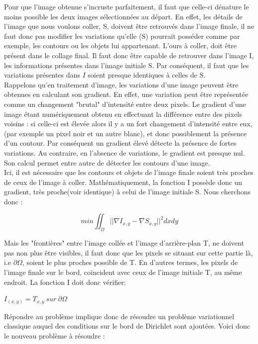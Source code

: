 Pour que l'image obtenue s'incruste parfaitement, il faut que celle-ci dénature le moins possible les deux images sélectionnées au départ. En effet, les détails de l'image que nous voulons coller, S, doivent être retrouvés dans l'image finale, il ne faut donc pas modifier les variations qu'elle (S) pourrait posséder comme par exemple, les contours ou les objets lui appartenant. L'ours  à coller, doit être présent dans le collage final. Il faut donc être capable de retrouver dans l'image I, les informations présentes dans l'image initiale S. Par conséquent, il faut que les variations présentes dans $I$ soient presque identiques à celles de S.\\
Rappelons qu'en traitement d'image, les variations d'une image peuvent être obtenues en calculant son gradient. En effet, une variation peut être représentée comme un changement "brutal" d'intensité entre deux pixels. Le gradient d'une image étant numériquement obtenu en effectuant la différence entre des pixels voisins : si celle-ci est élevée alors il y a un fort changement d'intensité entre eux, (par exemple un pixel noir et un autre blanc), et donc possiblement la présence d'un contour. Par conséquent un gradient élevé détecte la présence de fortes variations. Au contraire, en l'absence de variations, le gradient est presque nul. Son calcul permet entre autre de détecter les contours d'une image.\\
Ici, il est nécessaire que les contours et objets de l'image finale soient très proches de ceux de l'image à coller. Mathématiquement, la fonction I possède donc un gradient, très proche(voir identique) à celui de l'image initiale S. Nous cherchons donc :
\begin{center}
    $$ min \iint_\Omega || \nabla I_{x,y} - \nabla S_{x,y}||^2 dxdy$$
\end{center} 

Mais les "frontières" entre l'image collée et l'image d'arrière-plan T, ne doivent pas non plus être visibles, il faut donc que les pixels se situant sur cette partie là, i.e $\partial \Omega$, soient le plus proches possible de T. En d'autres termes, les pixels de l'image finale sur le bord, coïncident avec ceux de l'image initiale T, au même endroit. La fonction I doit donc vérifier: 
\begin{center}
    $I_{(x,y)} = T_{x,y} \ sur\ \partial \Omega$
\end{center}

Répondre au problème implique donc de résoudre un problème variationnel classique auquel des conditions sur le bord de Dirichlet sont ajoutées. 
Voici donc le nouveau problème à résoudre :   


